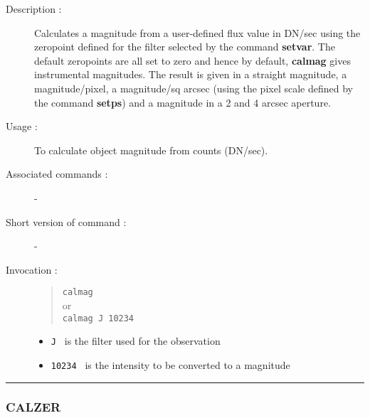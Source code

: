 \begin{description}

\item[Description :] Calculates a magnitude from a user-defined flux
value in DN/sec using the zeropoint defined for the filter selected by
the command {\bf setvar}. The default zeropoints are all set to zero
and hence by default, {\bf calmag} gives instrumental magnitudes.  The
result is given in a straight magnitude, a magnitude/pixel, a
magnitude/sq arcsec (using the pixel scale defined by the command {\bf
setps}) and a magnitude in a 2 and 4 arcsec aperture.

\item[Usage :] To calculate object magnitude from counts (DN/sec).
\item[Associated commands :] -
\item[Short version of command :] -
\item[Invocation :]

\begin{quote}{\tt  calmag }\\
or \\
{\tt calmag J 10234 }
\end{quote}

\begin{itemize}

\item {\tt J } is the filter used for the observation
\item {\tt 10234 } is the intensity to be converted to a magnitude

\end{itemize}

\end{description}

\hrule 
\subsubsection*{\label{CALZER}CALZER}

